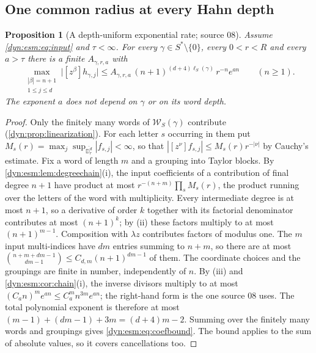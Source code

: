 \documentclass[11pt,letterpaper]{article}
\newtheorem{proposition}[proposition]{Proposition}
\theoremstyle{definition}
\theoremstyle{remark}
\newcommand{\word}{\mathcal W}
\numberwithin{equation}{section}
\begin{document}
\subsection{One common radius at every Hahn depth}
\label{dyn:esm:subsec:radius}

\begin{proposition}[A depth-uniform exponential rate; source 08]
\label{dyn:esm:prop:coefbound}
Assume \eqref{dyn:esm:eq:input} and $\tau<\infty$. For every
$\gamma\in S^{*}\setminus\{0\}$, every $0<r<R$ and every $a>\tau$ there is a
finite $A_{\gamma,r,a}$ with
\begin{equation}\label{dyn:esm:eq:coefbound}
 \max_{\substack{|\beta|=n+1\\1\le j\le d}}\bigl|[z^{\beta}]h_{\gamma,j}\bigr|
 \le A_{\gamma,r,a}\,(n+1)^{(d+4)\ell_S(\gamma)}\,r^{-n}e^{an}
 \qquad(n\ge1).
\end{equation}
The exponent $a$ does not depend on $\gamma$ or on its word depth.
\end{proposition}
\begin{proof}
Only the finitely many words of $\word_S(\gamma)$ contribute
(\cref{dyn:prop:linearization}). For each letter $s$ occurring in them put
$M_s(r)=\max_j\sup_{\overline{\mathbb D_r^{d}}}|f_{s,j}|<\infty$, so that
$|[z^{\nu}]f_{s,j}|\le M_s(r)r^{-|\nu|}$ by Cauchy's estimate. Fix a word of
length $m$ and a grouping into Taylor blocks. By
\cref{dyn:esm:lem:degreechain}(i), the input coefficients of a contribution
of final degree $n+1$ have product at most $r^{-(n+m)}\prod_sM_s(r)$, the
product running over the letters of the word with multiplicity. Every
intermediate degree is at most $n+1$, so a derivative of order $k$ together
with its factorial denominator contributes at most $(n+1)^{k}$; by (ii) these
factors multiply to at most $(n+1)^{m-1}$. Composition with $\lambda z$
contributes factors of modulus one. The $m$ input multi-indices have $dm$
entries summing to $n+m$, so there are at most
$\binom{n+m+dm-1}{dm-1}\le C_{d,m}(n+1)^{dm-1}$ of them. The coordinate
choices and the groupings are finite in number, independently of $n$. By
(iii) and \cref{dyn:esm:cor:chain}(i), the inverse divisors multiply to at
most $(C_an)^{m}e^{an}\le C_a^{m}n^{3m}e^{an}$; the right-hand form is the
one source 08 uses. The total polynomial exponent is therefore at most
$(m-1)+(dm-1)+3m=(d+4)m-2$. Summing over the finitely many words and
groupings gives \eqref{dyn:esm:eq:coefbound}. The bound applies to the sum of
absolute values, so it covers cancellations too.
\end{proof}
\end{document}
